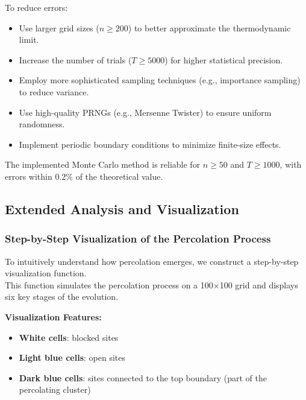 \documentclass[11pt]{article}
\providecommand{\tightlist}{%
      \setlength{\itemsep}{0pt}\setlength{\parskip}{0pt}}
\begin{document}
To reduce errors:

\begin{itemize}
\tightlist
\item
  Use larger grid sizes (\(n\geq200\)) to better approximate the
  thermodynamic limit.
\item
  Increase the number of trials (\(T\geq5000\)) for higher statistical
  precision.
\item
  Employ more sophisticated sampling techniques (e.g., importance
  sampling) to reduce variance.
\item
  Use high-quality PRNGs (e.g., Mersenne Twister) to ensure uniform
  randomness.
\item
  Implement periodic boundary conditions to minimize finite-size
  effects.
\end{itemize}

The implemented Monte Carlo method is reliable for \(n\geq50\) and
\(T\geq1000\), with errors within \(0.2\%\) of the theoretical value.

    \subsection{Extended Analysis and
Visualization}\label{extended-analysis-and-visualization}

\subsubsection{Step-by-Step Visualization of the Percolation
Process}\label{step-by-step-visualization-of-the-percolation-process}

To intuitively understand how percolation emerges, we construct a
step-by-step visualization function.\\
This function simulates the percolation process on a 100×100 grid and
displays six key stages of the evolution.

\textbf{Visualization Features:}

\begin{itemize}
\tightlist
\item
  \textbf{White cells}: blocked sites\\
\item
  \textbf{Light blue cells}: open sites\\
\item
  \textbf{Dark blue cells}: sites connected to the top boundary (part of
  the percolating cluster)
\end{itemize}
\end{document}
